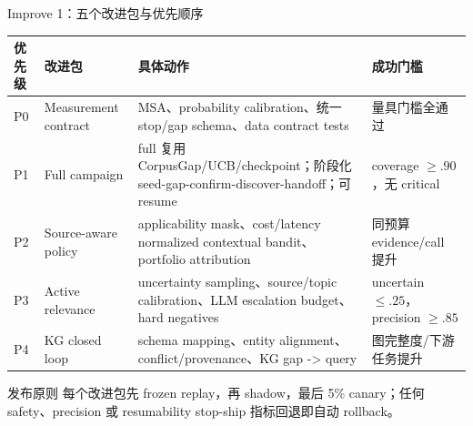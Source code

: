 \begin{frame}{Improve 1：五个改进包与优先顺序}
\scriptsize
\begin{tabularx}{\textwidth}{p{} p{} X p{}}
\toprule
优先级 & 改进包 & 具体动作 & 成功门槛 \\
\midrule
P0 & Measurement contract & MSA、probability calibration、统一 stop/gap schema、data contract tests & 量具门槛全通过 \\
P1 & Full campaign & full 复用 CorpusGap/UCB/checkpoint；阶段化 seed-gap-confirm-discover-handoff；可 resume & coverage $\ge.90$，无 critical \\
P2 & Source-aware policy & applicability mask、cost/latency normalized contextual bandit、portfolio attribution & 同预算 evidence/call 提升 \\
P3 & Active relevance & uncertainty sampling、source/topic calibration、LLM escalation budget、hard negatives & uncertain $\le.25$，precision $\ge.85$ \\
P4 & KG closed loop & schema mapping、entity alignment、conflict/provenance、KG gap -> query & 图完整度/下游任务提升 \\
\bottomrule
\end{tabularx}

\vspace{0.6em}
\begin{alertblock}{发布原则}
每个改进包先 frozen replay，再 shadow，最后 5\% canary；任何 safety、precision 或 resumability stop-ship 指标回退即自动 rollback。
\end{alertblock}
\end{frame}

